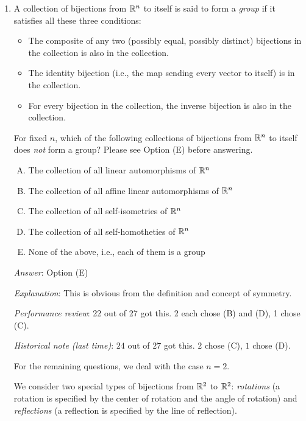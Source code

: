 \documentclass[10pt]{amsart}
\begin{document}
\begin{enumerate}
  {\em Performance review}: 10 out of 27 got this. 7 chose (E), 5
  chose (C), 4 chose (D), 1 chose (B).

  {\em Historical note (last time)}: $12$ out of $27$ got this. $11$ chose (E),
  $3$ chose (C), and $1$ chose (D).

\item A collection of bijections from $\mathbb{R}^n$ to itself is said to form
  a {\em group} if it satisfies all these three conditions:

  \begin{itemize}
  \item The composite of any two (possibly equal, possibly distinct)
    bijections in the collection is also in the collection.
  \item The identity bijection (i.e., the map sending every vector to
    itself) is in the collection.
  \item For every bijection in the collection, the inverse bijection is
    also in the collection.
  \end{itemize}

  For fixed $n$, which of the following collections of bijections from
  $\mathbb{R}^n$ to itself does {\em not} form a group? Please see Option (E)
  before answering.

  \begin{enumerate}[(A)]
  \item The collection of all linear automorphisms of $\mathbb{R}^n$
  \item The collection of all affine linear automorphisms of $\mathbb{R}^n$
  \item The collection of all self-isometries of $\mathbb{R}^n$
  \item The collection of all self-homotheties of $\mathbb{R}^n$
  \item None of the above, i.e., each of them is a group
  \end{enumerate}

  {\em Answer}: Option (E)

  {\em Explanation}: This is obvious from the definition and concept
  of symmetry.

  {\em Performance review}: 22 out of 27 got this. 2 each chose (B)
  and (D), 1 chose (C).

  {\em Historical note (last time)}: $24$ out of $27$ got this. $2$ chose (C),
  $1$ chose (D).

  For the remaining questions, we deal with the case $n = 2$.

  We consider two special types of bijections from $\mathbb{R}^2$ to $\mathbb{R}^2$:
  {\em rotations} (a rotation is specified by the center of rotation
  and the angle of rotation) and {\em reflections} (a reflection is
  specified by the line of reflection).
  

\end{enumerate}
\end{document}
